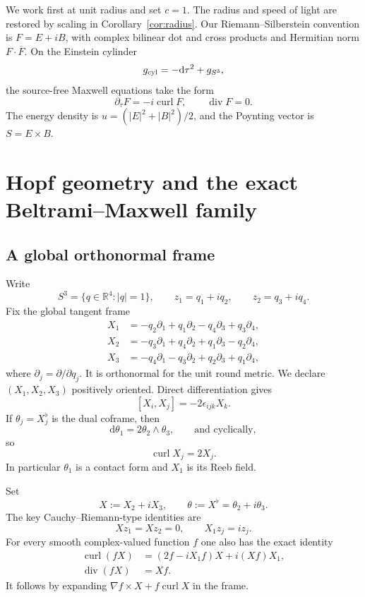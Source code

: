 \documentclass[11pt,a4paper]{article}
\numberwithin{equation}{section}
\theoremstyle{remark}
\newcommand{\curl}{\operatorname{curl}}
\newcommand{\divg}{\operatorname{div}}
\newcommand{\RR}{\mathbb{R}}
\newcommand{\dd}{\mathrm{d}}
\begin{document}
We work first at unit radius and set \(c=1\). The radius and speed of light are restored by scaling in Corollary~\ref{cor:radius}. Our Riemann--Silberstein convention is \(F=E+iB\), with complex bilinear dot and cross products and Hermitian norm \(F\cdot\overline F\). On the Einstein cylinder
\[
 g_{\rm cyl}=-\dd\tau^2+g_{S^3},
\]
the source-free Maxwell equations take the form
\begin{equation}\label{eq:maxwell}
 \partial_\tau F=-i\curl F,\qquad \divg F=0.
\end{equation}
The energy density is \(u=(|E|^2+|B|^2)/2\), and the Poynting vector is \(S=E\times B\).

\section{Hopf geometry and the exact Beltrami--Maxwell family}

\subsection{A global orthonormal frame}

Write
\[
 S^3=\{q\in\RR^4:|q|=1\},\qquad
 z_1=q_1+iq_2,\qquad z_2=q_3+iq_4.
\]
Fix the global tangent frame
\begin{align}
X_1&=-q_2\partial_1+q_1\partial_2-q_4\partial_3+q_3\partial_4,\nonumber\\
X_2&=-q_3\partial_1+q_4\partial_2+q_1\partial_3-q_2\partial_4,\label{eq:frame}\\
X_3&=-q_4\partial_1-q_3\partial_2+q_2\partial_3+q_1\partial_4,\nonumber
\end{align}
where \(\partial_j=\partial/\partial q_j\). It is orthonormal for the unit round metric. We declare \((X_1,X_2,X_3)\) positively oriented. Direct differentiation gives
\begin{equation}\label{eq:brackets}
 [X_i,X_j]=-2\epsilon_{ijk}X_k.
\end{equation}
If \(\theta_j=X_j^\flat\) is the dual coframe, then
\begin{equation}
 \dd\theta_1=2\theta_2\wedge\theta_3,
 \qquad\text{and cyclically},
\end{equation}
so
\begin{equation}\label{eq:curlframe}
 \curl X_j=2X_j.
\end{equation}
In particular \(\theta_1\) is a contact form and \(X_1\) is its Reeb field.

Set
\begin{equation}
 X:=X_2+iX_3,
 \qquad \theta:=X^\flat=\theta_2+i\theta_3.
\end{equation}
The key Cauchy--Riemann-type identities are
\begin{equation}\label{eq:CR}
 Xz_1=Xz_2=0,
 \qquad X_1z_j=iz_j.
\end{equation}
For every smooth complex-valued function \(f\) one also has the exact identity
\begin{align}
 \curl(fX)&=(2f-iX_1f)X+i(Xf)X_1,\label{eq:master}\\
 \divg(fX)&=Xf.\nonumber
\end{align}
It follows by expanding \(\nabla f\times X+f\curl X\) in the frame.
\end{document}
